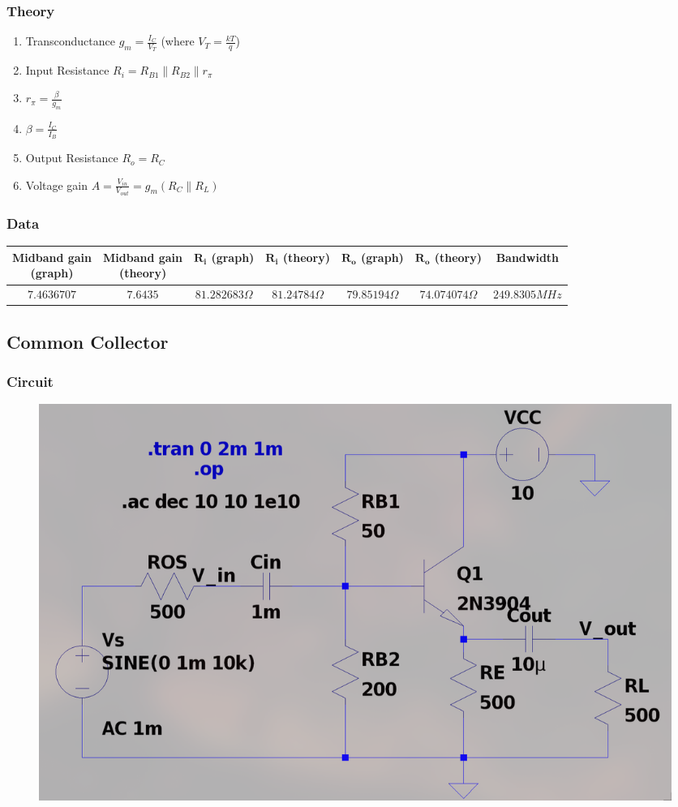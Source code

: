 \documentclass{article}
\newcommand{\brak}[1]{\ensuremath{\left(#1\right)}}
\providecommand{\brak}[1]{\ensuremath{\left(#1\right)}}
\begin{document}
\subsubsection{Theory}
\begin{enumerate}
    \item Transconductance $g_m = \frac{I_C}{V_T}$  (where $V_T = \frac{kT}{q}$)
    \item Input Resistance $R_i = R_{B1} \parallel R_{B2} \parallel r_{\pi} $
    \item $r_{\pi} = \frac{\beta}{g_m}$ 
    \item $\beta = \frac{I_C}{I_B}$
    \item Output Resistance $R_o = R_C $ 
    \item Voltage gain $A = \frac{V_{in}}{V_{out}} = g_m \brak{R_C \parallel R_L}$ 
\end{enumerate} 
\subsubsection{Data}
\begin{tabular}{|c|c|c|c|c|c|c|}
\hline
\makecell{\textbf{Midband gain} \\ \textbf{(graph)}} & \makecell{\textbf{Midband gain} \\ \textbf{(theory)}} & \makecell{$\mathbf{R_i}$ \\ \textbf{(graph)}} & \makecell{{$\mathbf{R_i}$} \\ \textbf{(theory)}} & \makecell{{$\mathbf{R_o}$} \\ \textbf{(graph)}} & \makecell{{$\mathbf{R_o}$} \\ \textbf{(theory)}} & \textbf{Bandwidth} \\
\hline
$7.4636707$ & $7.6435$ & $81.282683\Omega$ & $81.24784\Omega$& $79.85194\Omega$ & $74.074074\Omega$ & $249.8305MHz$ \\
\hline
\end{tabular}
\pagebreak
\subsection{Common Collector}
\subsubsection{Circuit}
\begin{figure}[h!]
        \centering
        \includegraphics[width=0.7\linewidth]{figs/bjt_cc_ckt.png}
    \end{figure}
\end{document}
